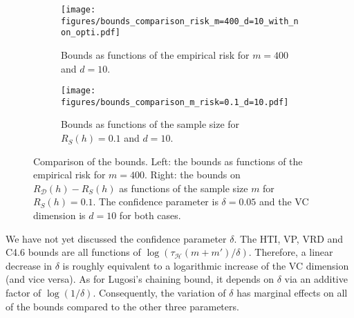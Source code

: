 \documentclass[twoside,11pt]{article}
\newcommand{\D}{\mathcal{D}}
\renewcommand{\H}{{\mathcal{H}}}
\begin{document}
\begin{figure}[h!]
\centering
\begin{subfigure}[t]{0.485\textwidth}
    \centering
    \texttt{[image: figures/bounds\_comparison\_risk\_m=400\_d=10\_with\_non\_opti.pdf]}
    \caption{Bounds as functions of the empirical risk for $m=400$ and $d=10$.}
    \label{fig:bounds_comp_risk_m=400_d=10}
\end{subfigure}\hfill
\begin{subfigure}[t]{0.485\textwidth}
    \centering
    \texttt{[image: figures/bounds\_comparison\_m\_risk=0.1\_d=10.pdf]}
    \caption{Bounds as functions of the sample size for $R_S(h)=0.1$ and $d=10$.}
    \label{fig:bounds_comp_m_risk=0.1_d=10}
\end{subfigure}
\caption{Comparison of the bounds.
Left: the bounds as functions of the empirical risk for $m=400$. Right: the bounds on $R_\D(h) - R_S(h)$ as functions of the sample size $m$ for $R_S(h) = 0.1$.
The confidence parameter is $\delta=0.05$ and the VC dimension is $d=10$ for both cases.}
\label{fig:bounds_comp_d=10_app}
\end{figure}






We have not yet discussed the confidence parameter $\delta$.
The HTI, VP, VRD and C4.6 bounds are all functions of $\log(\tau_\H(m+m')/\delta)$.
Therefore, a linear decrease in $\delta$ is roughly equivalent to a logarithmic increase of the VC dimension (and vice versa).
As for Lugosi's chaining bound, it depends on $\delta$ via an additive factor of $\log(1/\delta)$.
Consequently, the variation of $\delta$ has marginal effects on all of the bounds compared to the other three parameters.
\end{document}

